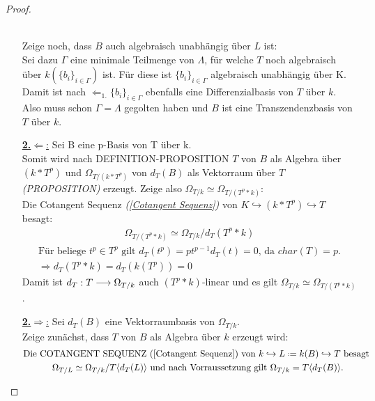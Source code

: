 \documentclass[10pt,a4paper]{report}
\newcommand{\comment}[1]{}
\newcommand{\functionfront}[3]{\nolinebreak{#1:#2 \longrightarrow #3}}
\newcommand{\divR}[2]{\Omega_{#1/#2}}
\newcommand{\divf}[1]{d_{#1}}
\newcommand*{\defeq}{\mathrel{\vcenter{\baselineskip0.5ex \lineskiplimit0pt
                     \hbox{\scriptsize.}\hbox{\scriptsize.}}}%
                     =}
\newcommand{\Verz}[1]{\langle #1 \rangle}
\begin{document}
\begin{proof}
\begin{itemize}
\ \\
Zeige noch, dass $B$ auch algebraisch unabhängig über $L$ ist:\\
Sei dazu $\Gamma$ eine minimale Teilmenge von $\Lambda$, für welche $T$ noch algebraisch über $k(\lbrace b_i \rbrace_{i \in \Gamma})$ ist. Für diese ist $\lbrace b_i \rbrace_{i \in \Gamma}$ algebraisch unabhängig über K.\\
Damit ist nach \glqq$\Leftarrow_{1.}$\grqq $\lbrace b_i \rbrace_{i \in \Gamma}$ ebenfalls eine Differenzialbasis von $T$ über $k$. Also muss schon $\Gamma = \Lambda$ gegolten haben und $B$ ist eine Transzendenzbasis von $T$ über $k$.
\item[\underline{\textbf{2.}\glqq$\Leftarrow$\grqq:}] Sei B eine p-Basis von T über k.\\
Somit wird nach DEFINITION-PROPOSITION \comment{\label{*p-Basis ist minnimaler Erzeuger von T als Algebra}} $T$ von $B$ als Algebra über $(k * T^p)$ und $\divR{T}{(k * T^p)}$ von $\divf{T}(B)$ als Vektorraum über $T$ 
\textit{(PROPOSITION)} \comment{\label{*Differenzial vererbt Erzeugendensystem}} erzeugt. Zeige also $\divR{T}{k} \simeq \divR{T}{(T^p * k)}$:\\
Die Cotangent Sequenz \textit{(\cref{Cotangent Sequenz})} von $K \hookrightarrow (k * T^p) \hookrightarrow T$ besagt:
\begin{gather*}
\divR{T}{(T^p * k)} \simeq \divR{T}{k}/\divf{T}(T^p * k)
\end{gather*}
\begin{gather*}
\text{Für beliege } t^p \in T^p \text{ gilt } \divf{T}(t^p) = pt^{p-1}\divf{T}(t) = 0 \text{,  da }char(T) = p.\\
\Rightarrow \divf{T}(T^p * k) = \divf{T}(k(T^p)) = 0
\end{gather*}
Damit ist $\functionfront{\divf{T}}{T}{\divR{T}{k}}$ auch $(T^p *k)$-linear und es gilt $\divR{T}{k} \simeq \divR{T}{(T^p * k)}$.
\item[\underline{\textbf{2.}\glqq$\Rightarrow$\grqq:}] Sei $\divf{T}(B)$ eine Vektorraumbasis von $\divR{T}{k}$.\\
Zeige zunächst, dass $T$ von $B$ als Algebra über $k$ erzeugt wird:
\begin{gather*}
\text{Die COTANGENT SEQUENZ (\cref{Cotangent Sequenz}) von $k \hookrightarrow L \defeq k(B) \hookrightarrow T$ besagt }\\
\divR{T}{L} \simeq \divR{T}{k}/T \Verz{\divf{T}(L)} \text{ und nach Vorraussetzung gilt } \divR{T}{k} = T \langle \divf{T}(B) \rangle. \\

\end{gather*}
\end{itemize}
\end{proof}
\end{document}
